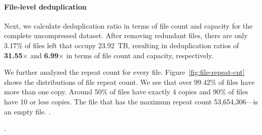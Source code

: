 \paragraph{File-level deduplication}
%
Next, we calculate deduplication ratio in terms of file count and capacity for
the complete uncompressed dataset.
%
After removing redundant files, there are only 3.17\% of files left that occupy
23.92~TB, resulting in deduplication ratios of \textbf{31.55$\times$} and
\textbf{6.99$\times$} in terms of file count and capacity, respectively.
%

%
We further analyzed the repeat count for every file.
%
Figure~\ref{fig:file-repeat-cnt} shows the distributions of file repeat count.  
%
We see that over 99.42\% of files have more than one copy.
%
Around 50\% of files have exactly 4 copies and 90\% of files have 10 or less
copies. 
%
The file that has the maximum repeat count 53,654,306---is an empty file.
%
.
%

%
.
